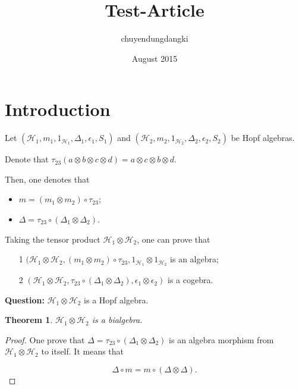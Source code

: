 \documentclass[10pt]{article}
\title{Test-Article}
\author{chuyendungdangki }
\date{August 2015}
\newtheorem{theorem}{Theorem}[section]
\begin{document}
\maketitle
\noindent
\parindent0pt

\section{Introduction}
Let $(\mathcal{H}_1,m_1,1_{\mathcal{H}_1},\Delta_1,\epsilon_1,S_1)$ and $(\mathcal{H}_2,m_2,1_{\mathcal{H}_2},\Delta_2,\epsilon_2,S_2)$ be Hopf algebras.

Denote that $\tau_{23} (a\otimes b \otimes c \otimes d) = a\otimes c \otimes b \otimes d$. 

Then, one denotes that
\begin{itemize}
\item $m = (m_1 \otimes m_2)\circ \tau_{23}$;
\item $\Delta = \tau_{23}\circ (\Delta_1 \otimes \Delta_2)$.
\end{itemize}

Taking the tensor product $\mathcal{H}_1 \otimes \mathcal{H}_2$, one can prove that
\begin{itemize}
\item[1]  $(\mathcal{H}_1 \otimes \mathcal{H}_2,(m_1\otimes m_2)\circ \tau_{23},1_{\mathcal{H}_1} \otimes 1_{\mathcal{H}_2}$ is an algebra;
\item[2] $(\mathcal{H}_1 \otimes \mathcal{H}_2,\tau_{23} \circ (\Delta_1 \otimes \Delta_2),\epsilon_1 \otimes \epsilon_2)$ is a cogebra.
\end{itemize}

{\bf Question:} $\mathcal{H}_1 \otimes \mathcal{H}_2$ is a Hopf algebra.

\begin{theorem}
$\mathcal{H}_1 \otimes \mathcal{H}_2$ is a bialgebra.
\end{theorem}

\begin{proof}
One prove that $\Delta = \tau_{23} \circ (\Delta_1 \otimes \Delta_2)$ is an algebra morphism from $\mathcal{H}_1 \otimes \mathcal{H}_2$ to itself. It means that

\begin{equation}
\Delta \circ m = m \circ (\Delta\otimes \Delta).
\end{equation}
\end{proof}
\end{document}
